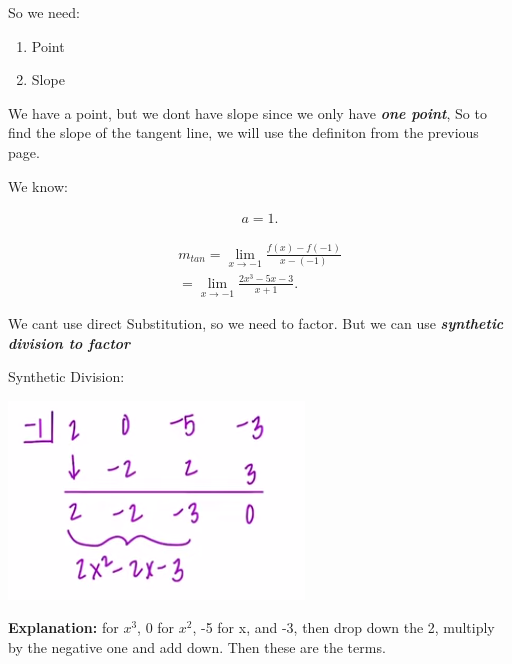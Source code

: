 \documentclass{report}
\begin{document}
        \bigbreak \noindent 
        So we need:
        \begin{enumerate}
            \item Point
            \item Slope
        \end{enumerate}

        \bigbreak \noindent 
        We have a point, but we dont have slope since we only have \textbf{\textit{one point}}, So to find the slope
        of the tangent line, we will use the definiton from the previous page. 

        \bigbreak \noindent 
        \begin{center}
            We know:
        \end{center}
        \begin{align*}
            a = 1
        .\end{align*}

        \begin{align*}
            m_{tan} = \lim\limits_{x \to -1}{ \frac{f(x) - f(-1)}{x- \left(-1\right)}} \\ 
            = \lim\limits_{x \to -1}{ \frac{2x^3-5x-3}{x+1}}
        .\end{align*}

        \bigbreak \noindent 
        We cant use direct Substitution, so we need to factor. But we can use \textbf{\textit{synthetic division to factor}}

        \begin{center}
            Synthetic Division:
        \end{center}

        \begin{center}
            \includegraphics[scale=0.5]{../images/21.png}
        \end{center}

        \bigbreak \noindent 
        \textbf{Explanation:}
        \bigbreak {} for $x^3$, 0 for $x^2$, -5 for x, and -3, then drop down the 2, multiply by the negative one and
        add down. Then these are the terms.
\end{document}
